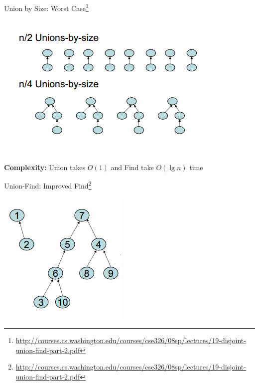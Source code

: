 \documentclass{beamer}
\begin{document}
\begin{frame}{Union by Size: Worst Case\footnote{\url{http://courses.cs.washington.edu/courses/cse326/08sp/lectures/19-disjoint-union-find-part-2.pdf}}}
    \begin{center}
        \includegraphics[scale=0.5]{unionByRankWorstCase.png} 
    \end{center}
    {\bf Complexity:} \pause Union takes $O(1)$ and Find take $O(\lg n)$ time
\end{frame}


\begin{frame}{Union-Find: Improved Find\footnote{\url{http://courses.cs.washington.edu/courses/cse326/08sp/lectures/19-disjoint-union-find-part-2.pdf}}}

    \begin{center}
        \includegraphics[scale=0.5]{pathCompression1.png} 
    \end{center}
\end{frame}
\end{document}
